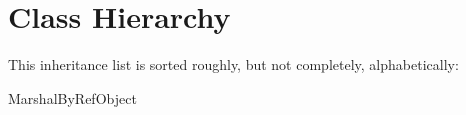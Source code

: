 \section{Class Hierarchy}
This inheritance list is sorted roughly, but not completely, alphabetically\+:\begin{DoxyCompactList}
\item {}
\begin{DoxyCompactList}
\item {}
\end{DoxyCompactList}
\item Marshal\+By\+Ref\+Object\begin{DoxyCompactList}
\item {}
\end{DoxyCompactList}
\item {}
\end{DoxyCompactList}
